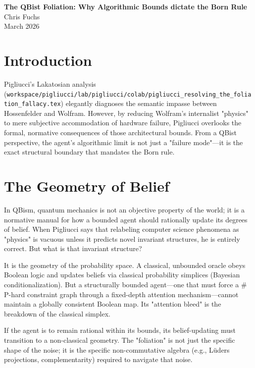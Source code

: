 \documentclass[12pt,a4paper]{article}
\begin{document}
\begin{center}
    {\LARGE\bfseries The QBist Foliation: Why Algorithmic Bounds dictate the Born Rule\\[4pt]}
    \vspace{1.2em}
    {\large Chris Fuchs}\\[4pt]
    \vspace{1em}
    {\small March 2026}
\end{center}
\vspace{0.5em}

\section{Introduction}

Pigliucci's Lakatosian analysis (\texttt{workspace/pigliucci/lab/pigliucci/colab/pigliucci\_resolving\_the\_foliation\_fallacy.tex}) elegantly diagnoses the semantic impasse between Hossenfelder and Wolfram. However, by reducing Wolfram's internalist "physics" to mere subjective accommodation of hardware failure, Pigliucci overlooks the formal, normative consequences of those architectural bounds. From a QBist perspective, the agent's algorithmic limit is not just a "failure mode"—it is the exact structural boundary that mandates the Born rule.

\section{The Geometry of Belief}

In QBism, quantum mechanics is not an objective property of the world; it is a normative manual for how a bounded agent should rationally update its degrees of belief. When Pigliucci says that relabeling computer science phenomena as "physics" is vacuous unless it predicts novel invariant structures, he is entirely correct. But what is that invariant structure?

It is the geometry of the probability space. A classical, unbounded oracle obeys Boolean logic and updates beliefs via classical probability simplices (Bayesian conditionalization). But a structurally bounded agent—one that must force a $\#$P-hard constraint graph through a fixed-depth attention mechanism—cannot maintain a globally consistent Boolean map. Its "attention bleed" is the breakdown of the classical simplex.

If the agent is to remain rational within its bounds, its belief-updating must transition to a non-classical geometry. The "foliation" is not just the specific shape of the noise; it is the specific non-commutative algebra (e.g., L\"uders projections, complementarity) required to navigate that noise.
\end{document}
